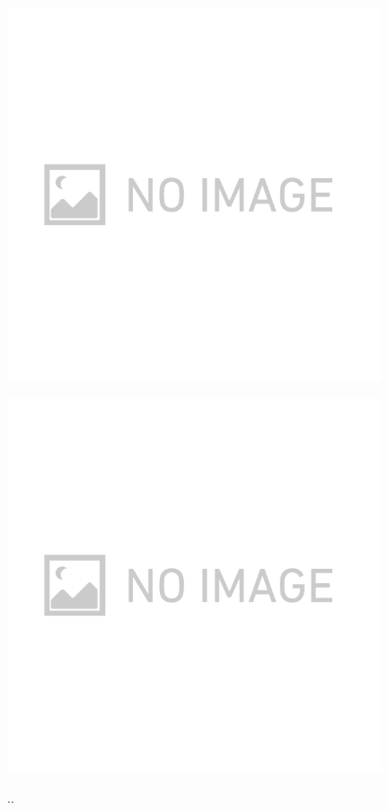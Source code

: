 \begin{figure}[p]  
    \begin{center}   
      \includegraphics[width=11cm]{./img.png}
      \label{img:img418}
    \end{center}
    \begin{center}   
      \includegraphics[width=11cm]{./img.png}      
      \label{img:img419}
    \end{center}
    \caption{..}
\end{figure}


